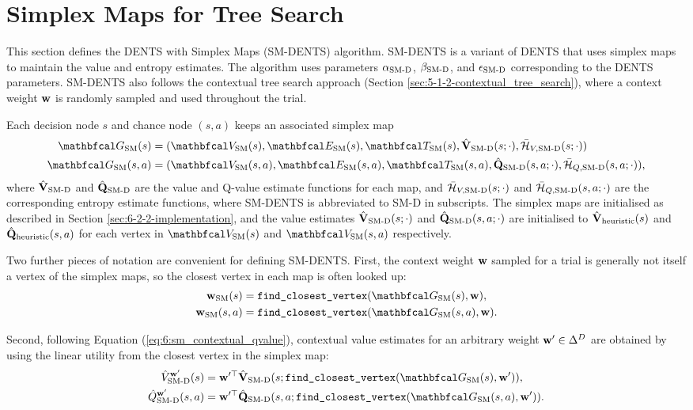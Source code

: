 \section{Simplex Maps for Tree Search}
\label{sec:6-3-algorithms}

    This section defines the DENTS with Simplex Maps (SM-DENTS) algorithm. SM-DENTS is a variant of DENTS that uses simplex maps to maintain the value and entropy estimates. The algorithm uses parameters ${\alpha_{{\textnormal{SM-D}}}}$, ${\beta_{{\textnormal{SM-D}}}}$, and ${\epsilon_{{\textnormal{SM-D}}}}$ corresponding to the DENTS parameters. SM-DENTS also follows the contextual tree search approach (Section \ref{sec:5-1-2-contextual_tree_search}), where a context weight $\mathbf{w}$ is randomly sampled and used throughout the trial.

    Each decision node $s$ and chance node $(s,a)$ keeps an associated simplex map 
    \begin{align}
        \GSM(s) &= (\VSM(s),\ESM(s),\TSM(s),\Vsmd(s;\cdot), \HVsmd(s;\cdot))
            \label{eq:6:simplex_map_decision_node} \\
        \GSM(s,a) &= (\VSM(s,a),\ESM(s,a),\TSM(s,a),\Qsmd(s,a;\cdot), \HQsmd(s,a;\cdot)),
    \end{align}
    where ${\hat{\mathbf{V}}_{{\textnormal{SM-D}}}}$ and ${\hat{\mathbf{Q}}_{{\textnormal{SM-D}}}}$ are the value and Q-value estimate functions for each map, and ${\bar{\mathcal{H}}_{V,{\textnormal{SM-D}}}}(s;\cdot)$ and ${\bar{\mathcal{H}}_{Q,{\textnormal{SM-D}}}}(s,a;\cdot)$ are the corresponding entropy estimate functions, where SM-DENTS is abbreviated to SM-D in subscripts. The simplex maps are initialised as described in Section \ref{sec:6-2-2-implementation}, and the value estimates ${\hat{\mathbf{V}}_{{\textnormal{SM-D}}}}(s;\cdot)$ and ${\hat{\mathbf{Q}}_{{\textnormal{SM-D}}}}(s,a;\cdot)$ are initialised to ${\hat{\mathbf{V}}_{\textnormal{heuristic}}}(s)$ and ${\hat{\mathbf{Q}}_{\textnormal{heuristic}}}(s,a)$ for each vertex in $\VSM(s)$ and $\VSM(s,a)$ respectively.
    
    Two further pieces of notation are convenient for defining SM-DENTS. First, the context weight $\mathbf{w}$ sampled for a trial is generally not itself a vertex of the simplex maps, so the closest vertex in each map is often looked up:
    \begin{align}
        \wSMat{s} &= \fcv(\GSM(s), \bff{w}), \label{eq:6:smdents_v_vertex_lookup} \\
        \wSMat{s,a} &= \fcv(\GSM(s,a), \bff{w}). \label{eq:6:smdents_q_vertex_lookup} 
    \end{align}

    Second, following Equation (\ref{eq:6:sm_contextual_qvalue}), contextual value estimates for an arbitrary weight $\mathbf{w}'\in\Delta^D$ are obtained by using the linear utility from the closest vertex in the simplex map:
    \begin{align}
        \Vsmdctxcstm{\bff{w}'}(s)
            &= \bff{w}'^\top \Vsmd(s;\fcv(\GSM(s),\bff{w}')),
        \label{eq:6:smdents_contextual_value} \\
        \Qsmdctxcstm{\bff{w}'}(s,a)
            &= \bff{w}'^\top \Qsmd(s,a;\fcv(\GSM(s,a),\bff{w}')).
        \label{eq:6:smdents_contextual_qvalue}
    \end{align}





